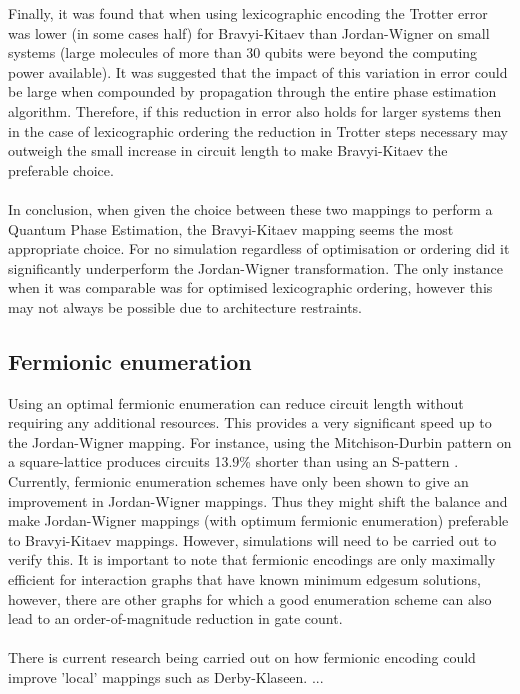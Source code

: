 \documentclass[twoside]{article}
\begin{document}
Finally, it was found that when using lexicographic encoding the Trotter error was lower (in some cases half) for Bravyi-Kitaev than Jordan-Wigner on small systems (large molecules of more than 30 qubits were beyond the computing power available). It was suggested that the impact of this variation in error could be large when compounded by propagation through the entire phase estimation algorithm. Therefore, if this reduction in error also holds for larger systems then in the case of lexicographic ordering the reduction in Trotter steps necessary may outweigh the small increase in circuit length to make Bravyi-Kitaev the preferable choice. \\\\
In conclusion, when given the choice between these two mappings to perform a Quantum Phase Estimation, the Bravyi-Kitaev mapping seems the most appropriate choice. For no simulation regardless of optimisation or ordering did it significantly underperform the Jordan-Wigner transformation. The only instance when it was comparable was for optimised lexicographic ordering, however this may not always be possible due to architecture restraints. 
\subsection{Fermionic enumeration}
Using an optimal fermionic enumeration can reduce circuit length without requiring any additional resources. This provides a very significant speed up to the Jordan-Wigner mapping. For instance, using the Mitchison-Durbin pattern on a square-lattice produces circuits 13.9\% shorter than using an S-pattern \cite{fermionicEncoding}. Currently, fermionic enumeration schemes have only been shown to give an improvement in Jordan-Wigner mappings. Thus they might shift the balance and make Jordan-Wigner mappings (with optimum fermionic enumeration) preferable to Bravyi-Kitaev mappings. However, simulations will need to be carried out to verify this. It is important to note that fermionic encodings are only maximally efficient for interaction graphs that have known minimum edgesum solutions, however, there are other graphs for which a good enumeration scheme can also lead to an order-of-magnitude reduction in gate count.\\\\
There is current research being carried out on how fermionic encoding could improve 'local' mappings such as Derby-Klaseen. ...
\end{document}
